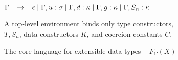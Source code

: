 {\begin{figure}[H]
\vspace{5mm}
\vspace{2mm}

$
\Gamma \;\;\; \to \;\;\; \epsilon \;|\; \Gamma,u:\sigma \;|\; \Gamma,d:\kappa
\;|\; \Gamma,g:\kappa \;|\; \Gamma,S_n:\kappa
$

A top-level environment binds only type constructors, \\
$T,S_n$, data constructors $K$, and coercion constants $C$.
\caption{The core language for extensible data types -- $F_C(X)$}
\label{fig:langdef}
\end{figure}}

